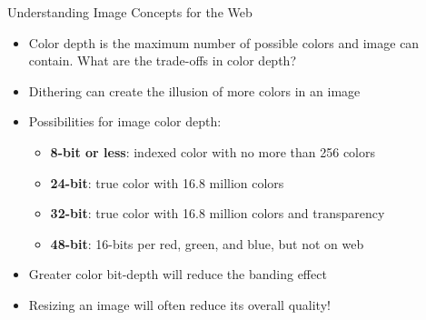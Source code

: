 \documentclass[14pt,aspectratio=169]{beamer}
\begin{document}
%
\begin{frame}{Understanding Image Concepts for the Web}
  \begin{itemize}
    \item Color depth is the maximum number of possible colors and image can
      contain. What are the trade-offs in color depth?
      \vspace*{-.2in}
    \item Dithering can create the illusion of more colors in an image
      \vspace*{-.2in}
    \item Possibilities for image color depth:
      \begin{itemize}
        \item {\bf 8-bit or less}: indexed color with no more than 256 colors
        \item {\bf 24-bit}: true color with 16.8 million colors
        \item {\bf 32-bit}: true color with 16.8 million colors and transparency
        \item {\bf 48-bit}: 16-bits per red, green, and blue, but not on web
      \end{itemize}
      \vspace*{-.25in}
    \item Greater color bit-depth will reduce the banding effect
      \vspace*{-.25in}
    \item Resizing an image will often reduce its overall quality!
  \end{itemize}
\end{frame}
\end{document}
